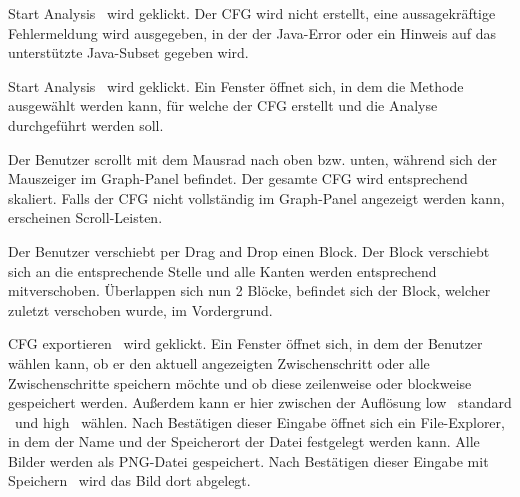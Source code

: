 {\glqq Start Analysis \grqq\ wird geklickt.}
{Der CFG wird nicht erstellt, eine aussagekräftige Fehlermeldung wird ausgegeben, in der der Java-Error oder ein Hinweis auf das unterstützte Java-Subset gegeben wird.}

{\glqq Start Analysis \grqq\ wird geklickt.}
{Ein Fenster öffnet sich, in dem die Methode ausgewählt werden kann, für welche der CFG erstellt und die Analyse durchgeführt werden soll.}



{Der Benutzer scrollt mit dem Mausrad nach oben bzw. unten, während sich der Mauszeiger im Graph-Panel befindet.}
{Der gesamte CFG wird entsprechend skaliert. Falls der CFG nicht vollständig im Graph-Panel angezeigt werden kann, erscheinen Scroll-Leisten.}

{Der Benutzer verschiebt per \glqq Drag and Drop \grqq einen Block.}
{Der Block verschiebt sich an die entsprechende Stelle und alle Kanten werden entsprechend mitverschoben. Überlappen sich nun 2 Blöcke, befindet sich der Block, welcher zuletzt verschoben wurde, im Vordergrund.}


{\glqq CFG exportieren \grqq\ wird geklickt.}
{Ein Fenster öffnet sich, in dem der Benutzer wählen kann, ob er den aktuell angezeigten Zwischenschritt oder alle Zwischenschritte speichern möchte und ob diese zeilenweise oder blockweise gespeichert werden. Außerdem kann er hier zwischen der Auflösung \glqq low \grqq\, \glqq standard \grqq\ und  \glqq  high \grqq\ wählen. Nach Bestätigen dieser Eingabe öffnet sich ein File-Explorer, in dem der Name und der Speicherort der Datei festgelegt werden kann. Alle Bilder werden als PNG-Datei gespeichert. Nach Bestätigen dieser Eingabe mit  \glqq Speichern \grqq\ wird das Bild dort abgelegt.}




